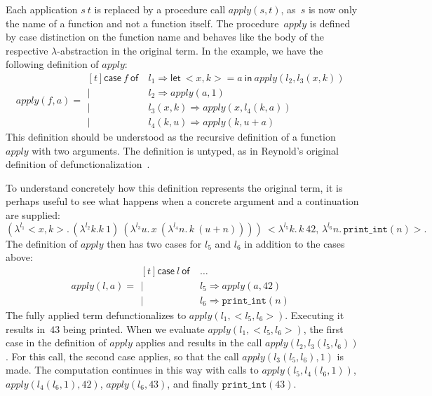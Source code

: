 \documentclass{LMCS}
\theoremstyle{definition}
\theoremstyle{plain}
\newcommand{\kw}[1]{\mathsf{#1}}
\newcommand{\Capply}{\textit{apply}}
\newcommand{\tlet}[3]{\kw{let}\ #2=#1\ \kw{in}\ #3}
\begin{document}
Each  application $s\ t$ is replaced by a 
procedure call $\Capply(s,t)$, as~$s$ is now only the name of a function and not a
function itself. The procedure~$\Capply$ is defined by case distinction on
the function name and behaves like the body of the respective
$\lambda$-abstraction in the original term. In the example,
we have the following definition of $\Capply$:
\[
\Capply(f, a) =
\begin{aligned}[t]
  \kw{case}\ f\ \kw{of}\
   &l_1\Rightarrow \tlet a {<x,k>} {\Capply(l_2, l_3(x,k))}\\
   \mid\ &l_2 \Rightarrow \Capply(a, 1)\\
   \mid\ &l_3(x,k) \Rightarrow \Capply(x, l_4(k,a))\\
   \mid\ &l_4(k,u) \Rightarrow \Capply(k, u + a)
\end{aligned}
\]
This definition should be understood as the recursive definition of 
a function $\Capply$ with two arguments. The definition is untyped, as in Reynold's original
definition of defunctionalization~\cite{reynolds}.

To understand concretely how this definition represents the original term, 
it is perhaps useful to see what happens when
a concrete argument and a continuation are supplied:
$ (\lambda^{l_1} <x,k>.\, (\lambda^{l_2} k. k\ 1)\ (\lambda^{l_3} u.\, x\ (\lambda^{l_4} n.\, k\ (u+n))))
\ <\lambda^{l_5} k.\, k\ 42,\, \lambda^{l_6} n.\, \texttt{print\_int}(n)>.
$
The definition of $\Capply$ then has two cases for $l_5$ and $l_6$
in addition to the cases above:
\[
\Capply(l, a) =
\begin{aligned}[t]
\kw{case}\ l\ \kw{of}\ 
   &\dots \\
   \mid\ &l_5 \Rightarrow \Capply(a, 42)\\
   \mid\ &l_6 \Rightarrow \texttt{print\_int}(n)
\end{aligned}
\]
The fully applied term defunctionalizes to $\Capply(l_1,<l_5,l_6>)$.
Executing it results in~$43$ being printed. 
When we evaluate $\Capply(l_1,<l_5,l_6>)$, the first case in the definition
of $\Capply$ applies and results in the call $\Capply(l_2,l_3(l_5,l_6))$.
For this call, the second case applies, so that the call 
$\Capply(l_3(l_5,l_6),1)$ is made. The computation continues in
this way with calls to
$\Capply(l_5, l_4(l_6,1))$,
$\Capply(l_4(l_6,1), 42)$,
$\Capply(l_6, 43)$, and finally
$\texttt{print\_int}(43)$.
\end{document}
